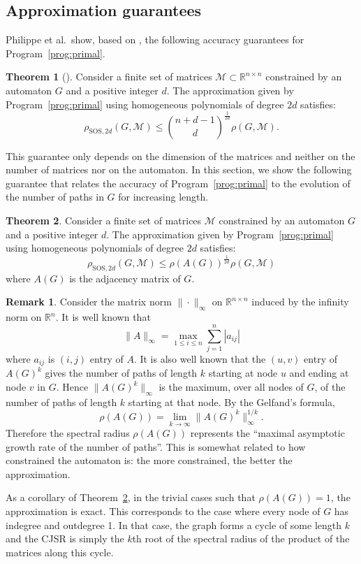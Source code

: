 \documentclass{sig-alternate-05-2015}
\newcommand{\1}{\mathbf{1}}
\theoremstyle{definition}
\newtheorem{mytheo}{Theorem}
\newtheorem{myrem}{Remark}
\newcommand{\R}{\mathbb{R}}
\newcommand{\Rn}{\R^n}
\newcommand{\Rnn}{\R^{n \times n}}
\newcommand{\A}{\mathcal{M}}
\newcommand{\G}{G}
\newcommand{\jsrsos}[1][2d]{\rho_{\mathrm{SOS},#1}(\G,\A)}
\newcommand{\cjsr}{\rho(\G,\A)}
\newcommand{\defAG   }{a finite set of matrices $\A$ constrained by an automaton $\G$}
\newcommand{\defAGn  }{a finite set of matrices $\A \subset \mathbb{R}^{n \times n}$ constrained by an automaton $\G$}
\begin{document}
\subsection{Approximation guarantees}
\label{sec:quality}
Philippe et al.\  show, based on \cite{parrilo2008approximation},  the following accuracy guarantees for Program~\ref{prog:primal}.
\begin{mytheo}[{\cite[Theorem~3.6]{philippe2015stability}}]
  \label{theo:matt}
  Consider \defAGn{} and a positive integer $d$.
  The approximation given by Program~\ref{prog:primal} using homogeneous polynomials of degree $2d$
  satisfies:
  \[ \jsrsos \leq {n+d-1 \choose d}^{\frac{1}{2d}} \cjsr. \]
\end{mytheo}

This guarantee only depends on the dimension of the matrices and neither on the number of matrices nor on the automaton.
In this section, we show the following guarantee that relates the accuracy of Program~\ref{prog:primal} to the evolution
of the number of paths in $\G$ for increasing length.
\begin{mytheo}
  \label{theo:second}
  Consider \defAG{} and a positive integer $d$.
  The approximation given by Program~\ref{prog:primal} using homogeneous polynomials of degree $2d$
  satisfies:
  \[ \jsrsos \leq \rho(A(\G))^{\frac{1}{2d}}\cjsr \]
  where $A(\G)$ is the adjacency matrix of $\G$.
\end{mytheo}

\begin{myrem}
  \label{rem:path}
  Consider the matrix norm $\|\cdot\|_\infty$ on $\Rnn$ induced by the infinity norm on $\Rn$.
  It is well known that
  \[ \|A\|_{\infty} = \max_{1 \leq i \leq n} \sum_{j=1}^n |a_{ij}| \]
  where $a_{ij}$ is $(i,j)$ entry of $A$.
  It is also well known that the $(u,v)$ entry of $A(\G)^k$ gives
  the number of paths of length $k$ starting at node $u$ and ending at node $v$ in $\G$.
  Hence $\|A(\G)^k\|_\infty$ is the maximum, over all nodes of $\G$,
  of the number of paths of length $k$ starting at that node.
  By the Gelfand's formula,
  \[
    \rho(A(\G)) = \lim_{k \to \infty} \|A(\G)^k\|_\infty^{1/k}.
  \]
  Therefore the spectral radius $\rho(A(\G))$ represents the ``maximal asymptotic growth rate of the number of paths''.
  This is somewhat related to how constrained the automaton is: the more constrained, the better the approximation.
\end{myrem}

As a corollary of Theorem~\ref{theo:second}, in the trivial cases such that $\rho(A(\G)) = 1$, the approximation is exact.
This corresponds to the case where every node of $\G$ has indegree and outdegree 1.
In that case, the graph forms a cycle of some length $k$ and the CJSR is simply the $k$th root of the spectral radius of the product of the matrices along this cycle.
\end{document}
